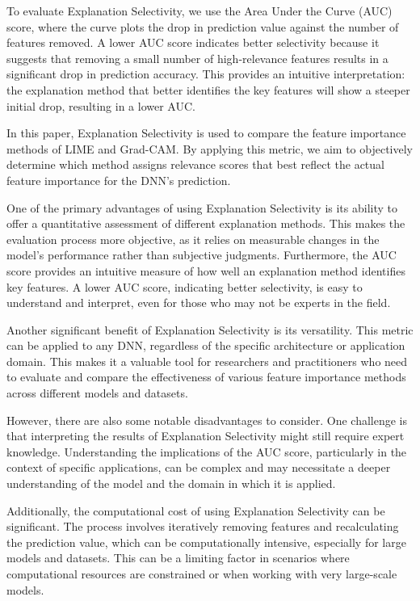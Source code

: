 \documentclass{article}
\begin{document}
To evaluate Explanation Selectivity, we use the Area Under the Curve (AUC) score, where the curve plots the drop in prediction value against the number of features removed. A lower AUC score indicates better selectivity because it suggests that removing a small number of high-relevance features results in a significant drop in prediction accuracy. This provides an intuitive interpretation: the explanation method that better identifies the key features will show a steeper initial drop, resulting in a lower AUC.

In this paper, Explanation Selectivity is used to compare the feature importance methods of LIME and Grad-CAM. By applying this metric, we aim to objectively determine which method assigns relevance scores that best reflect the actual feature importance for the DNN’s prediction.

One of the primary advantages of using Explanation Selectivity is its ability to offer a quantitative assessment of different explanation methods. This makes the evaluation process more objective, as it relies on measurable changes in the model’s performance rather than subjective judgments. Furthermore, the AUC score provides an intuitive measure of how well an explanation method identifies key features. A lower AUC score, indicating better selectivity, is easy to understand and interpret, even for those who may not be experts in the field.

Another significant benefit of Explanation Selectivity is its versatility. This metric can be applied to any DNN, regardless of the specific architecture or application domain. This makes it a valuable tool for researchers and practitioners who need to evaluate and compare the effectiveness of various feature importance methods across different models and datasets.

However, there are also some notable disadvantages to consider. One challenge is that interpreting the results of Explanation Selectivity might still require expert knowledge. Understanding the implications of the AUC score, particularly in the context of specific applications, can be complex and may necessitate a deeper understanding of the model and the domain in which it is applied.

Additionally, the computational cost of using Explanation Selectivity can be significant. The process involves iteratively removing features and recalculating the prediction value, which can be computationally intensive, especially for large models and datasets. This can be a limiting factor in scenarios where computational resources are constrained or when working with very large-scale models.
\end{document}
